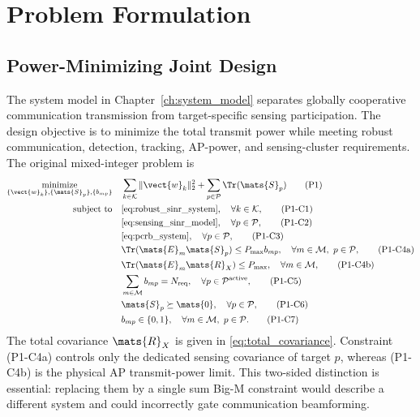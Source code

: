 \chapter{Problem Formulation}\label{ch:problem_formulation}

\section{Power-Minimizing Joint Design}\label{sec:joint_problem}

The system model in Chapter~\ref{ch:system_model} separates globally
cooperative communication transmission from target-specific sensing
participation.  The design objective is to minimize the total transmit power
while meeting robust communication, detection, tracking, AP-power, and
sensing-cluster requirements.  The original mixed-integer problem is
\begin{subequations}\label{prob:p1}
\begin{align}
 \underset{\{\vect{w}_k\},\{\mats{S}_p\},\{b_{mp}\}}{\operatorname{minimize}}
 \quad & \sum_{k\in\mathcal{K}}\|\vect{w}_k\|_2^2+
 \sum_{p\in\mathcal{P}}\Tr(\mats{S}_p) \tag{P1}\\
 \text{subject to}\quad
 & \eqref{eq:robust_sinr_system}, \quad \forall k\in\mathcal{K},
 \tag{P1-C1}\\
 & \eqref{eq:sensing_sinr_model}, \quad \forall p\in\mathcal{P},
 \tag{P1-C2}\\
 & \eqref{eq:pcrb_system}, \quad \forall p\in\mathcal{P},
 \tag{P1-C3}\\
 & \Tr(\mats{E}_m\mats{S}_p)\leq P_{\max}b_{mp},
 \quad \forall m\in\mathcal{M},\ p\in\mathcal{P}, \tag{P1-C4a}\\
 & \Tr(\mats{E}_m\mats{R}_X)\leq P_{\max},
 \quad \forall m\in\mathcal{M}, \tag{P1-C4b}\\
 & \sum_{m\in\mathcal{M}}b_{mp}=N_{\mathrm{req}},
 \quad \forall p\in\mathcal{P}^{\mathrm{active}}, \tag{P1-C5}\\
 & \mats{S}_p\succeq\mats{0},
 \quad \forall p\in\mathcal{P}, \tag{P1-C6}\\
 & b_{mp}\in\{0,1\},
 \quad \forall m\in\mathcal{M},\ p\in\mathcal{P}. \tag{P1-C7}
\end{align}
\end{subequations}
The total covariance $\mats{R}_X$ is given in \eqref{eq:total_covariance}.
Constraint (P1-C4a) controls only the dedicated sensing covariance of target
$p$, whereas (P1-C4b) is the physical AP transmit-power limit.  This
two-sided distinction is essential: replacing them by a single sum Big-M
constraint would describe a different system and could incorrectly gate
communication beamforming.

